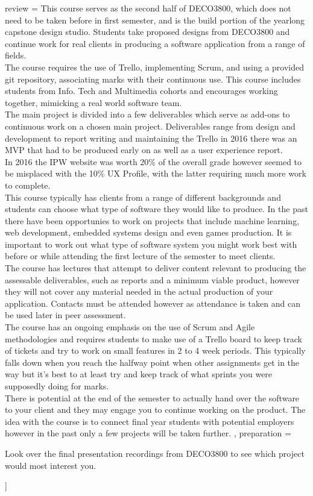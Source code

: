review = {
    This course serves as the second half of DECO3800, which does not need to be taken before in first semester, and is the build portion of the yearlong capstone design studio. Students take proposed designs from DECO3800 and continue work for real clients in producing a software application from a range of fields.\\

    The course requires the use of Trello, implementing Scrum, and using a provided git repository, associating marks with their continuous use. This course includes students from Info. Tech and Multimedia cohorts and encourages working together, mimicking a real world software team.\\

    The main project is divided into a few deliverables which serve as add-ons to continuous work on a chosen main project. Deliverables range from design and development to report writing and maintaining the Trello in 2016 there was an MVP that had to be produced early on as well as a user experience report.\\

    In 2016 the IPW website was worth 20\% of the overall grade however seemed to be misplaced with the 10\% UX Profile, with the latter requiring much more work to complete.\\

    This course typically has clients from a range of different backgrounds and students can choose what type of software they would like to produce. In the past there have been opportunies to work on projects that include machine learning, web development, embedded systems design and even games production. It is important to work out what type of software system you might work best with before or while attending the first lecture of the semester to meet clients.\\

    The course has lectures that attempt to deliver content relevant to producing the assessable deliverables, such as reports and a minimum viable product, however they will not cover any material needed in the actual production of your application. Contacts must be attended however as attendance is taken and can be used later in peer assessment.\\

    The course has an ongoing emphasis on the use of Scrum and Agile methodologies and requires students to make use of a Trello board to keep track of tickets and try to work on small features in 2 to 4 week periods. This typically falls down when you reach the halfway point when other assignments get in the way but it's best to at least try and keep track of what sprints you were supposedly doing for marks.\\

    There is potential at the end of the semester to actually hand over the software to your client and they may engage you to continue working on the product. The idea with the course is to connect final year students with potential employers however in the past only a few projects will be taken further.
},
preparation = {
    \item Look over the final presentation recordings from DECO3800 to see which project would most interest you.
}]{}
